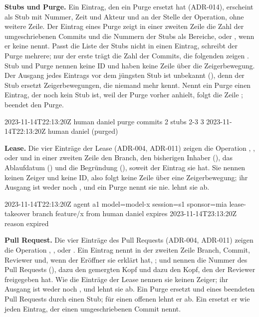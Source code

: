 {\bf Stubs und Purge.} Ein Eintrag, den ein Purge ersetzt hat (ADR-014), erscheint als Stub mit
Nummer, Zeit und Akteur und  an der Stelle der Operation, ohne weitere Zeile.
Der Eintrag eines Purge zeigt in einer zweiten Zeile die Zahl der umgeschriebenen Commits und die
Nummern der Stubs als Bereiche, oder \type{-}, wenn er keine nennt.
Passt die Liste der Stubs nicht in einen Eintrag, schreibt der Purge mehrere;
nur der erste trägt die Zahl der Commits, die folgenden zeigen .
Stub und Purge nennen keine ID und haben keine Zeile über die Zeigerbewegung.
Der Ausgang jedes Eintrags vor dem jüngsten Stub ist unbekannt (), denn der Stub ersetzt
Zeigerbewegungen, die niemand mehr kennt. Nennt ein Purge einen Eintrag, der noch kein Stub ist,
weil der Purge vorher anhielt, folgt die Zeile
;  beendet den
Purge.

  2023-11-14T22:13:20Z  human daniel  purge
    commits 2  stubs 2-3
3  2023-11-14T22:13:20Z  human daniel  (purged)
\stoptyping

{\bf Lease.} Die vier Einträge der Lease (ADR-004, ADR-011) zeigen die Operation
, ,  oder 
und in einer zweiten Zeile den Branch, den bisherigen Inhaber (), das Ablaufdatum
() und die Begründung (), soweit der Eintrag sie hat.
Sie nennen keinen Zeiger und keine ID, also folgt keine Zeile über eine Zeigerbewegung;
ihr Ausgang ist weder \type{!} noch , und ein Purge nennt sie nie.
 lehnt sie ab.

  2023-11-14T22:13:20Z  agent a1 model=model-x session=s1 sponsor=mia  lease-takeover
    branch feature/x  from human daniel  expires 2023-11-14T23:13:20Z  reason expired
\stoptyping

{\bf Pull Request.} Die vier Einträge des Pull Requests (ADR-004, ADR-011) zeigen die Operation
, ,  oder .
Ein Eintrag  nennt in der zweiten Zeile Branch, Commit, Reviewer und, wenn der
Eröffner sie erklärt hat, ;  und  nennen die Nummer
des Pull Requests (),  dazu den gemergten Kopf und 
dazu den Kopf, den der Reviewer freigegeben hat.
Wie die Einträge der Lease nennen sie keinen Zeiger; ihr Ausgang ist weder \type{!} noch
, und  lehnt sie ab.
Ein Purge ersetzt  und  eines beendeten Pull Requests durch einen
Stub; für einen offenen lehnt er ab.
Ein  ersetzt er wie jeden Eintrag, der einen umgeschriebenen Commit nennt.


